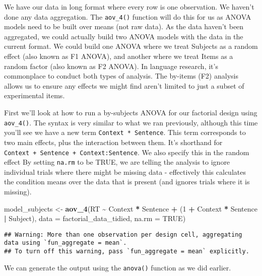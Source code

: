 \documentclass[
]{book}
\newenvironment{Shaded}{\begin{snugshade}}{\end{snugshade}}
\newcommand{\AttributeTok}[1]{\textcolor[rgb]{0.13,0.29,0.53}{#1}}
\newcommand{\ConstantTok}[1]{\textcolor[rgb]{0.56,0.35,0.01}{#1}}
\newcommand{\DecValTok}[1]{\textcolor[rgb]{0.00,0.00,0.81}{#1}}
\newcommand{\FunctionTok}[1]{\textcolor[rgb]{0.13,0.29,0.53}{\textbf{#1}}}
\newcommand{\NormalTok}[1]{#1}
\newcommand{\OtherTok}[1]{\textcolor[rgb]{0.56,0.35,0.01}{#1}}
\newcommand{\SpecialCharTok}[1]{\textcolor[rgb]{0.81,0.36,0.00}{\textbf{#1}}}
\begin{document}
We have our data in long format where every row is one observation. We haven't done any data aggregation. The \texttt{aov\_4()} function will do this for us as ANOVA models need to be built over means (not raw data). As the data haven't been aggregated, we could actually build two ANOVA models with the data in the current format. We could build one ANOVA where we treat Subjects as a random effect (also known as F1 ANOVA), and another where we treat Items as a random factor (also known as F2 ANOVA). In language research, it's commonplace to conduct both types of analysis. The by-items (F2) analysis allows us to ensure any effects we might find aren't limited to just a subset of experimental items.

First we'll look at how to run a by-subjects ANOVA for our factorial design using \texttt{aov\_4()}. The syntax is very similar to what we ran previously, although this time you'll see we have a new term \texttt{Context\ *\ Sentence}. This term corresponds to two main effects, plus the interaction between them. It's shorthand for \texttt{Context\ +\ Sentence\ +\ Context:Sentence}. We also specify this in the random effect By setting \texttt{na.rm} to be TRUE, we are telling the analysis to ignore individual trials where there might be missing data - effectively this calculates the condition means over the data that is present (and ignores trials where it is missing).

\begin{Shaded}
\begin{Highlighting}[]
\NormalTok{model\_subjects }\OtherTok{\textless{}{-}} \FunctionTok{aov\_4}\NormalTok{(RT }\SpecialCharTok{\textasciitilde{}}\NormalTok{ Context }\SpecialCharTok{*}\NormalTok{ Sentence }\SpecialCharTok{+}\NormalTok{ (}\DecValTok{1} \SpecialCharTok{+}\NormalTok{ Context }\SpecialCharTok{*}\NormalTok{ Sentence }\SpecialCharTok{|}\NormalTok{ Subject), }\AttributeTok{data =}\NormalTok{ factorial\_data\_tidied, }\AttributeTok{na.rm =} \ConstantTok{TRUE}\NormalTok{)}
\end{Highlighting}
\end{Shaded}

\begin{verbatim}
## Warning: More than one observation per design cell, aggregating data using `fun_aggregate = mean`.
## To turn off this warning, pass `fun_aggregate = mean` explicitly.
\end{verbatim}

We can generate the output using the \texttt{anova()} function as we did earlier.
\end{document}

